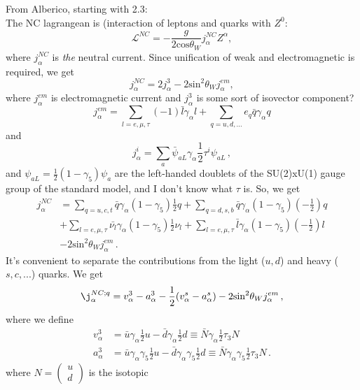   From Alberico, starting with 2.3: \\
  The NC lagrangean is (interaction of leptons and quarks with $Z^0$:
  \[
      \mathcal{L}^{NC} = -\frac{g}{2\textrm{cos}\theta_W}j_{\alpha}^{NC}Z^{\alpha},
  \]
  where $j_{\alpha}^{NC}$ is \textit{the} neutral current. Since unification of
  weak and electromagnetic is required, we get
  \[
    j_{\alpha}^{NC} = 2j_{\alpha}^3 - 2\textrm{sin}^2\theta_W j_{\alpha}^{em},
  \]
  where $j_{\alpha}^{em}$ is electromagnetic current and $j_{\alpha}^3$ is some
  sort of isovector component?
  \[
      j_{\alpha}^{em} = \sum_{l = e,\mu,\tau} (-1)\bar{l}\gamma_{\alpha}l + \sum_{q=u,d,...}e_q\bar{q}\gamma_{\alpha}q
  \]
  and
  \[
    j_{\alpha}^i = \sum_a \bar{\psi}_{aL} \gamma_{\alpha}\frac{1}{2} \tau^i \psi_{aL} \,,
  \]
  and $\psi_{aL} = \frac{1}{2}(1-\gamma_5)\psi_a$ are the left-handed doublets
  of the SU(2)xU(1) gauge group of the standard model, and I don't know what $\tau$ is.
  So, we get
  \begin{align*}
      j_{\alpha}^{NC} &= \sum_{q=u,c,t}\bar{q}\gamma_{\alpha}(1-\gamma_5)\frac{1}{2}q
                       + \sum_{q=d,s,b}\bar{q}\gamma_{\alpha}(1-\gamma_5)\left(-\frac{1}{2}\right)q \\
                      &+ \sum_{l=e,\mu,\tau}\bar{\nu_l}\gamma_{\alpha}(1-\gamma_5)\frac{1}{2}\nu_l
                       + \sum_{l=e,\mu,\tau}\bar{l}\gamma_{\alpha}(1-\gamma_5)\left(-\frac{1}{2}\right)l \\
                      &- 2\mathrm{sin}^2\theta_W j_{\alpha}^{em} \,.
  \end{align*}
  It's convenient to separate the contributions from the light ($u,d$) and
  heavy ($s,c,...$) quarks. We get
  \[
    \j_{\alpha}^{NC;q} = v_{\alpha}^3 - a_{\alpha}^3 - \frac{1}{2}(v_{\alpha}^s - a_{\alpha}^s) - 2\mathrm{sin}^2\theta_W j_{\alpha}^{em} \,,
  \]
  where we define
  \begin{align*}
      v_{\alpha}^3 &= \bar{u}\gamma_{\alpha}\frac{1}{2}u - \bar{d}\gamma_{\alpha}\frac{1}{2}d \equiv \bar{N} \gamma_{\alpha}\frac{1}{2}\tau_3 N \\
      a_{\alpha}^3 &= \bar{u}\gamma_{\alpha}\gamma_5\frac{1}{2}u - \bar{d}\gamma_{\alpha}\gamma_5\frac{1}{2}d \equiv \bar{N} \gamma_{\alpha}\gamma_5\frac{1}{2}\tau_3 N \,.
  \end{align*}
  where $N = \left(\begin{matrix}{u}\\{d}\end{matrix} \right)$ is the isotopic
